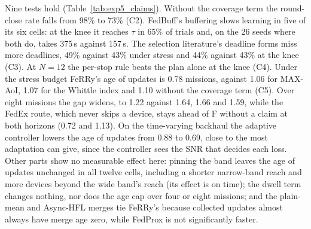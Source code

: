 \documentclass[conference]{IEEEtran}
\begin{document}
Nine tests hold (Table~\ref{tab:exp5_claims}). Without the coverage term the
round-close rate falls from 98\% to 73\% (C2). FedBuff's buffering slows learning
in five of its six cells: at the knee it reaches $\tau$ in 65\% of trials and, on
the 26 seeds where both do, takes 375\,s against 157\,s. The selection
literature's deadline forms miss more deadlines, 49\% against 43\% under stress
and 44\% against 43\% at the knee (C3). At $N=12$ the per-stop rule beats the plan
alone at the knee (C4). Under the stress budget FeRRy's age of updates is 0.78
missions, against 1.06 for MAX-AoI, 1.07 for the Whittle index and 1.10 without
the coverage term (C5). Over eight missions the gap widens, to 1.22 against 1.64,
1.66 and 1.59, while the FedEx route, which never skips a device, stays ahead of
F without a claim at both horizons (0.72 and 1.13). On the time-varying backhaul the
adaptive controller lowers the age of updates from 0.88 to 0.69, close to the most adaptation
can give, since the controller sees the SNR that decides each loss. Other parts
show no measurable effect here: pinning the band leaves the age of updates
unchanged in all twelve cells, including a shorter narrow-band reach and more
devices beyond the wide band's reach (its effect is on time); the dwell term
changes nothing, nor does the age cap over four or eight missions; and the
plain-mean and Async-HFL merges tie FeRRy's because collected updates almost
always have merge age zero, while FedProx is not significantly faster.
\end{document}
